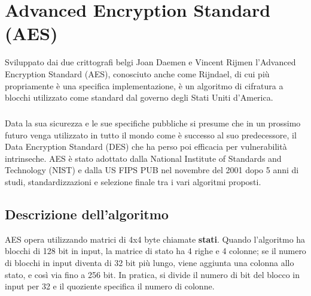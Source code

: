 \chapter{Advanced Encryption Standard (AES)}
Sviluppato dai due crittografi belgi Joan Daemen e Vincent Rijmen l'Advanced Encryption Standard (AES), conosciuto anche come Rijndael, di cui più propriamente è una specifica implementazione, è un algoritmo di cifratura a blocchi utilizzato come standard dal governo degli Stati Uniti d'America. 

\paragraph{}
Data la sua sicurezza e le sue specifiche pubbliche si presume che in un prossimo futuro venga utilizzato in tutto il mondo come è successo al suo predecessore, il Data Encryption Standard (DES) che ha perso poi efficacia per vulnerabilità intrinseche. AES è stato adottato dalla National Institute of Standards and Technology (NIST) e dalla US FIPS PUB nel novembre del 2001 dopo 5 anni di studi, standardizzazioni e selezione finale tra i vari algoritmi proposti.

\section{Descrizione dell'algoritmo}
AES opera utilizzando matrici di 4x4 byte chiamate \textbf{stati}. Quando l'algoritmo ha blocchi di 128 bit in input, la matrice di stato ha 4 righe e 4 colonne; se il numero di blocchi in input diventa di 32 bit più lungo, viene aggiunta una colonna allo stato, e così via fino a 256 bit. In pratica, si divide il numero di bit del blocco in input per 32 e il quoziente specifica il numero di colonne.